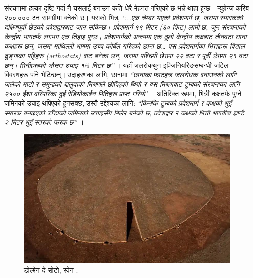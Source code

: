 \documentclass[10pt,twocolumn,letterpaper]{article}
\begin{document}
संरचनामा हल्का दृष्टि गर्दा नै यसलाई बनाउन कति धेरै मेहनत गरिएको छ भन्ने थाहा हुन्छ - न्युग्रेन्ज करिब २००,००० टन सामग्रीमा बनेको छ। यसको भित्र, \textit{“...एक चेम्बर भएको प्रवेशमार्ग छ, जसमा स्मारकको दक्षिणपूर्वी छेउको प्रवेशद्वारबाट जान सकिन्छ। प्रवेशमार्ग १९ मिटर (६० फिट) लामो छ, जुन संरचनाको केन्द्रीय भागतर्फ लगभग एक तिहाइ पुग्छ। प्रवेशमार्गको अन्त्यमा एक ठूलो केन्द्रीय कक्षबाट तीनवटा साना कक्षहरू छन्, जसमा माथिल्लो भागमा उच्च कोर्बेल गरिएको छाना छ… यस प्रवेशमार्गका भित्ताहरू विशाल ढुङ्गाका पट्टिहरू (orthostats) बाट बनेका छन्, जसमा पश्चिमी छेउमा २२ वटा र पूर्वी छेउमा २१ वटा छन्। तिनीहरूको औसत उचाइ १½ मिटर छ”} \cite{70}। यहाँ जलरोकथुन इञ्जिनियरिङसम्बन्धी जटिल विवरणहरू पनि भेटिन्छन्। उदाहरणका लागि, छानामा \textit{“छानाका फाटहरू जलरोधक बनाउनको लागि जलेको माटो र समुन्द्रको बालुवाको मिश्रणले छोपिएको थियो र यस मिश्रणबाट टुम्बको संरचनाका लागि २५०० ईशा वरिपरिका दुई रेडियोकार्बन मितिहरू प्राप्त गरियो"} \cite{71}। अतिरिक्त रूपमा, भित्री कक्षतर्फ पुग्ने जमिनको उचाइ थपिएको हुनसक्छ, उस्तै उद्देश्यका लागि: \textit{“किनकि टुम्बको प्रवेशमार्ग र कक्षको भुइँ स्मारक बनाइएको डाँडाको जमिनको उचाइसँग मिलेर बनेको छ, प्रवेशद्वार र कक्षको भित्री भागबीच झण्डै २ मिटर भुइँ स्तरको फरक छ”} \cite{71}।

\begin{figure}[b]
\begin{center}
   \includegraphics[width=1\linewidth]{dolmen.jpg}
\end{center}
   \caption{डोल्मेन दे सोटो, स्पेन \cite{53}.}
\label{fig:9}
\label{fig:onecol}
\end{figure}
\end{document}
